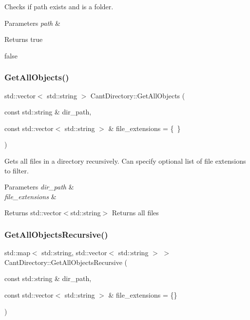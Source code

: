 Checks if path exists and is a folder. 


\begin{DoxyParams}{Parameters}
{\em path} & \\
\hline
\end{DoxyParams}
\begin{DoxyReturn}{Returns}
true 

false 
\end{DoxyReturn}
\mbox{\label{namespaceCantDirectory_a8a0cb619ba4ccb459785ea1394b63983}} 
\subsubsection{\texorpdfstring{Get\+All\+Objects()}{GetAllObjects()}}
{\footnotesize\ttfamily std\+::vector$<$ std\+::string $>$ Cant\+Directory\+::\+Get\+All\+Objects (\begin{DoxyParamCaption}\item[{const std\+::string \&}]{dir\+\_\+path,  }\item[{const std\+::vector$<$ std\+::string $>$ \&}]{file\+\_\+extensions = {\ttfamily \{~\}} }\end{DoxyParamCaption})}



Gets all files in a directory recursively. Can specify optional list of file extensions to filter. 


\begin{DoxyParams}{Parameters}
{\em dir\+\_\+path} & \\
\hline
{\em file\+\_\+extensions} & \\
\hline
\end{DoxyParams}
\begin{DoxyReturn}{Returns}
std\+::vector$<$std\+::string$>$ Returns all files 
\end{DoxyReturn}
\mbox{\label{namespaceCantDirectory_a60226f9192495eadf59bb646d5df9322}} 
\subsubsection{\texorpdfstring{Get\+All\+Objects\+Recursive()}{GetAllObjectsRecursive()}}
{\footnotesize\ttfamily std\+::map$<$ std\+::string, std\+::vector$<$ std\+::string $>$ $>$ Cant\+Directory\+::\+Get\+All\+Objects\+Recursive (\begin{DoxyParamCaption}\item[{const std\+::string \&}]{dir\+\_\+path,  }\item[{const std\+::vector$<$ std\+::string $>$ \&}]{file\+\_\+extensions = {\ttfamily \{\}} }\end{DoxyParamCaption})}



